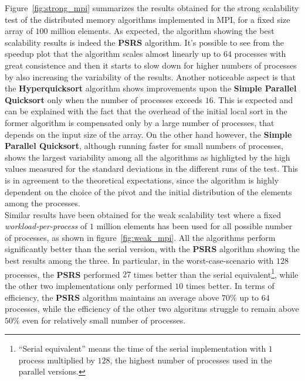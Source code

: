 \documentclass[../main.tex]{subfiles}
\begin{document}
Figure~\ref{fig:strong_mpi} summarizes the results obtained for the strong scalability test of the distributed memory algorithms implemented in MPI, for a fixed size array of $100$ million elements. As expected, the algorithm showing the best scalability results is indeed the \textbf{PSRS} algorithm. It's possible to see from the speedup plot that the algorithm scales almost linearly up to $64$ processes with great consistence and then it starts to slow down for higher numbers of processes by also increasing the variability of the results. Another noticeable aspect is that the \textbf{Hyperquicksort} algorithm shows improvements upon the \textbf{Simple Parallel Quicksort} only when the number of processes exceeds $16$. This is expected and can be explained with the fact that the overhead of the initial local sort in the former algorithm is compensated only by a large number of processes, that depends on the input size of the array. On the other hand however, the \textbf{Simple Parallel Quicksort}, although running faster for small numbers of processes, shows the largest variability among all the algorithms as highligted by the high values measured for the standard deviations in the different runs of the test. This is in agreement to the theoretical expectations, since the algorithm is highly dependent on the choice of the pivot and the initial distribution of the elements among the processes.\\
Similar results have been obtained for the weak scalability test where a fixed \textit{workload-per-process} of $1$ million elements has been used for all possible number of processes, as shown in 
figure~\ref{fig:weak_mpi}. All the algorithms perform significantly better than the serial version, with the \textbf{PSRS} algorithm showing the best results among the three. In particular, in the worst-case-scenario with $128$ processes, the \textbf{PSRS} performed $27$ times better than the serial equivalent\footnote{``Serial equivalent'' means the time of the serial implementation with $1$ process multiplied by $128$, the highest number of processes used in the parallel versions.}, while the other two implementations only performed $10$ times better. In terms of efficiency, the \textbf{PSRS} algorithm maintains an average above $70\%$ up to $64$ processes, while the efficiency of the other two algoritms struggle to remain above $50\%$ even for relatively small number of processes.\\
\end{document}
